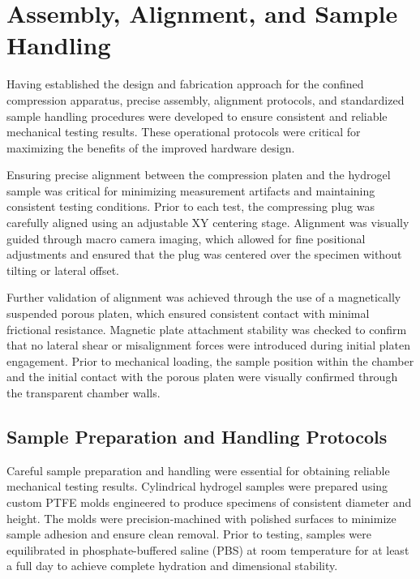 \clearpage
\section{Assembly, Alignment, and Sample Handling}

Having established the design and fabrication approach for the confined compression apparatus, precise assembly, alignment protocols, and standardized sample handling procedures were developed to ensure consistent and reliable mechanical testing results. These operational protocols were critical for maximizing the benefits of the improved hardware design.

Ensuring precise alignment between the compression platen and the hydrogel sample was critical for minimizing measurement artifacts and maintaining consistent testing conditions. Prior to each test, the compressing plug was carefully aligned using an adjustable XY centering stage. Alignment was visually guided through macro camera imaging, which allowed for fine positional adjustments and ensured that the plug was centered over the specimen without tilting or lateral offset.

Further validation of alignment was achieved through the use of a magnetically suspended porous platen, which ensured consistent contact with minimal frictional resistance. Magnetic plate attachment stability was checked to confirm that no lateral shear or misalignment forces were introduced during initial platen engagement. Prior to mechanical loading, the sample position within the chamber and the initial contact with the porous platen were visually confirmed through the transparent chamber walls.

\subsection{Sample Preparation and Handling Protocols}

Careful sample preparation and handling were essential for obtaining reliable mechanical testing results. Cylindrical hydrogel samples were prepared using custom PTFE molds engineered to produce specimens of consistent diameter and height. The molds were precision-machined with polished surfaces to minimize sample adhesion and ensure clean removal. Prior to testing, samples were equilibrated in phosphate-buffered saline (PBS) at room temperature for at least a full day to achieve complete hydration and dimensional stability.

